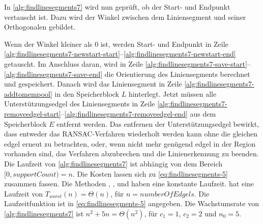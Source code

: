 In \autoref{alg:findlinesegments7} wird nun geprüft, ob der Start- und Endpunkt vertauscht ist. Dazu wird der Winkel
 zwischen dem Liniensegment und seiner Orthogonalen gebildet.

Wenn der Winkel kleiner als $0$ ist, werden Start- und Endpunkt in Zeile
 \ref{alg:findlinesegments7-newstart-start}--\ref{alg:findlinesegments7-newstart-end} getauscht. Im Anschluss daran,
 wird in Zeile \ref{alg:findlinesegments7-save-start}--\ref{alg:findlinesegments7-save-end} die Orientierung des
 Liniensegments berechnet und gespeichert. Danach wird das Liniensegment in Zeile
 \ref{alg:findlinesegments7-addtomempool} in den Speicherblock $L$ hinterlegt. Jetzt müssen alle Unterstützungsedgel
 des Liniensegments in Zeile \ref{alg:findlinesegments7-removeedgel-start}--\ref{alg:findlinesegments7-removeedgel-end}
 aus dem Speicherblock $E$ entfernt werden. Das entfernen der Unterstützungsedgel bewirkt, dass entweder das
 RANSAC-Verfahren wiederholt werden kann ohne die gleichen \gls{edgel} erneut zu betrachten, oder, wenn nicht mehr
 genügend \gls{edgel} in der Region vorhanden sind, das Verfahren abzubrechen und die Linienerkennung zu beenden. Die
 Laufzeit von \autoref{alg:findlinesegments7} ist abhängig von dem Bereich $[0,\mathit{supportCount}) = n$. Die
 Kosten lassen sich zu \autoref{eq:findlinesegments-5} zusammen fassen. Die Methoden ,
 ,  und  haben eine konstante Laufzeit.
  hat eine Laufzeit von $T_{worst}(n)=\Theta(n)$, für $n = \mathit{numberOfEdgels}$. Die
 Laufzeitfunktion ist in \autoref{eq:findlinesegments-5} angegeben. Die Wachstumsrate von
 \autoref{alg:findlinesegments7} ist $n^2 + 5n = \Theta(n^2)$, für $c_{1} = 1$, $c_{2} = 2$ und $n_{0} = 5$.


